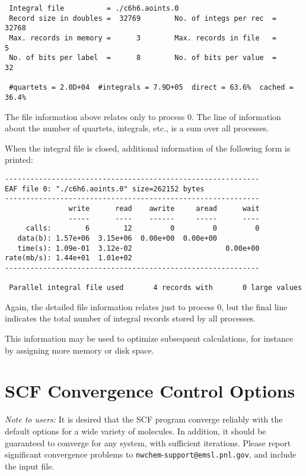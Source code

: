 \begin{verbatim}
 Integral file          = ./c6h6.aoints.0
 Record size in doubles =  32769        No. of integs per rec  =  32768
 Max. records in memory =      3        Max. records in file   =      5
 No. of bits per label  =      8        No. of bits per value  =     32

 #quartets = 2.0D+04  #integrals = 7.9D+05  direct = 63.6%  cached = 36.4%
\end{verbatim}

The file information above relates only to process 0.  The line of
information about the number of quartets, integrals, etc., is a sum
over all processes.

When the integral file is closed, additional information of the following
form is printed:

\begin{verbatim}
------------------------------------------------------------
EAF file 0: "./c6h6.aoints.0" size=262152 bytes
------------------------------------------------------------
               write      read    awrite     aread      wait
               -----      ----    ------     -----      ----
     calls:        6        12         0         0         0
   data(b): 1.57e+06  3.15e+06  0.00e+00  0.00e+00
   time(s): 1.09e-01  3.12e-02                      0.00e+00
rate(mb/s): 1.44e+01  1.01e+02
------------------------------------------------------------

 Parallel integral file used       4 records with       0 large values
\end{verbatim}
Again, the detailed file information relates just to process 0, but
the final line indicates the total number of integral records stored
by all processes. 

This information may be used to optimize subsequent calculations, for
instance by assigning more memory or disk space.

\section{SCF Convergence Control Options}
\label{sec:scfconv}

{\em Note to users:} It is desired that the SCF program converge
reliably with the default options for a wide variety of molecules.  In
addition, it should be guaranteed to converge for any system, with
sufficient iterations.  Please report significant convergence problems
to \verb+nwchem+-\verb+support@+\-\verb+emsl.pnl.gov+, and include the
input file.

